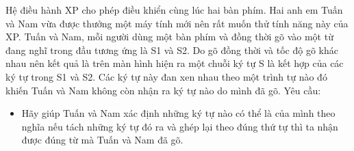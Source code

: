 Hệ điều hành XP cho phép điều khiển cùng lúc hai bàn phím. Hai anh em Tuấn và Nam vừa được thưởng một máy tính mới nên rất muốn thử tính năng này của XP. Tuấn và Nam, mỗi người dùng một bàn phím và đồng thời gõ vào một từ đang nghĩ trong đầu tương ứng là S1 và S2. Do gõ đồng thời và tốc độ gõ khác nhau nên kết quả là trên màn hình hiện ra một chuỗi ký tự S là kết hợp của các ký tự trong S1 và S2. Các ký tự này đan xen nhau theo một trình tự nào đó khiến Tuấn và Nam không còn nhận ra ký tự nào do mình đã gõ.
Yêu cầu:
\begin{itemize}
	\item     Hãy giúp Tuấn và Nam xác định những ký tự nào có thể  là của mình theo nghĩa nếu tách những ký tự đó ra và ghép lại theo đúng thứ tự thì ta nhận được đúng từ mà Tuấn và Nam đã gõ.   
\end{itemize}